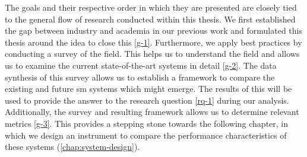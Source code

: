The goals and their respective order in which they are  presented are closely tied to the general flow of research conducted within this thesis. We first established the gap between industry and academia in our previous work and formulated this thesis around the idea to close this \ref{g-1}. Furthermore, we apply best practices by conducting a survey of the field. This helps us to understand the field and allows us to examine the current state-of-the-art systems in detail \ref{g-2}. The data synthesis of this survey allows us to establish a framework to compare the existing and future \gls{sm} systems which might emerge. The results of this will be used to provide the answer to the research question \ref{rq-1} during our analysis. Additionally, the survey and resulting framework allows us to determine relevant metrics \ref{g-3}. This provides a stepping stone towards the following chapter, in which we design an instrument to compare the performance characteristics of these systems (\cref{chap:system-design}).